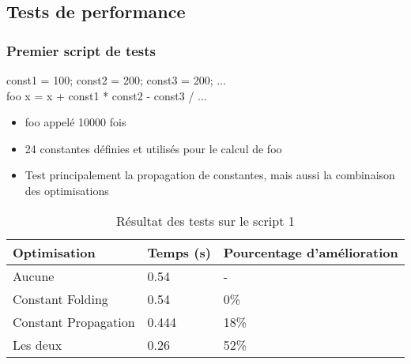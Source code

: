 \documentclass{beamer}
\begin{document}
\subsection{Tests de performance}
\begin{frame}
    \frametitle{Premier script de tests}
    const1 = 100; const2 = 200; const3 = 200; ...\\
    foo x = x + const1 * const2 - const3 / ...\\
    \bigskip
    \begin{itemize}
      \item foo appelé 10000 fois
      \item 24 constantes définies et utilisés pour le calcul de foo
      \item Test principalement la propagation de constantes, mais aussi la
        combinaison des optimisations
    \end{itemize}

    \begin{table}
      \begin{tabular}{l l l}
        \toprule
        \textbf{Optimisation} & \textbf{Temps (s)} & \textbf{Pourcentage d'amélioration}\\
        \midrule
        Aucune & 0.54 & - \\
        Constant Folding & 0.54 & 0\% \\
        Constant Propagation & 0.444 & 18\% \\
        Les deux & 0.26 & 52\% \\
        \bottomrule
      \end{tabular}
      \caption{Résultat des tests sur le script 1}
    \end{table}

\end{frame}
\end{document}
